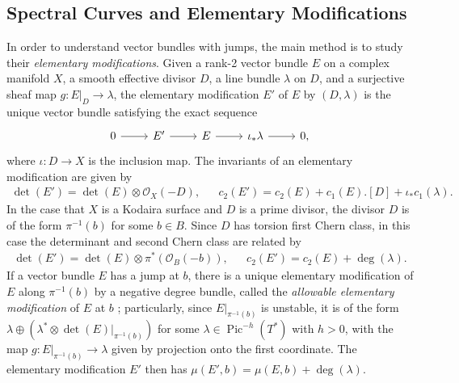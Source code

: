 \documentclass{article}[12pt]
\theoremstyle{definition}
\theoremstyle{remark}
\numberwithin{equation}{section}
\newcommand \mc{\mathcal}
\DeclareMathOperator{\Pic}{Pic}
\begin{document}
\subsection{Spectral Curves and Elementary Modifications}
In order to understand vector bundles with jumps, the main method is to study their \emph{elementary modifications}. Given a rank-2 vector bundle $E$ on a complex manifold $X$, a smooth effective divisor $D$, a line bundle $\lambda$ on $D$, and a surjective sheaf map $g:E|_D\to \lambda$, the elementary modification $E'$ of $E$ by $(D,\lambda)$ is the unique vector bundle satisfying the exact sequence $$\begin{tikzcd}
	0 \arrow[r] & E' \arrow[r] & E\arrow[r] & \iota_*\lambda\arrow[r] & 0,
\end{tikzcd}$$
where $\iota:D\to X$ is the inclusion map. The invariants of an elementary modification are given by \begin{align*}\det(E')=\det(E)\otimes \mc{O}_X(-D), && c_2(E')=c_2(E)+c_1(E).[D]+\iota_*c_1(\lambda).\end{align*}
In the case that $X$ is a Kodaira surface and $D$ is a prime divisor, the divisor $D$ is of the form $\pi^{-1}(b)$ for some $b \in B$. Since $D$ has torsion first Chern class, in this case the determinant and second Chern class are related by \begin{align*}
	\det(E')=\det(E)\otimes \pi^*(\mc{O}_B(-b)), && c_2(E')=c_2(E)+\deg(\lambda).
\end{align*}
If a vector bundle $E$ has a jump at $b$, there is a unique elementary modification of $E$ along $\pi^{-1}(b)$ by a negative degree bundle, called the \emph{allowable elementary modification} of $E$ at $b$ \cite[Section 4.1.2]{MorHopf}; particularly, since $E|_{\pi^{-1}(b)}$ is unstable, it is of the form $\lambda \oplus (\lambda^*\otimes \det(E)|_{\pi^{-1}(b)})$ for some $\lambda \in \Pic^{-h}(T^*)$ with $h>0$, with the map $g:E|_{\pi^{-1}(b)}\to \lambda$ given by projection onto the first coordinate. The elementary modification $E'$ then has $\mu(E',b)=\mu(E,b)+\deg(\lambda).$
\end{document}
